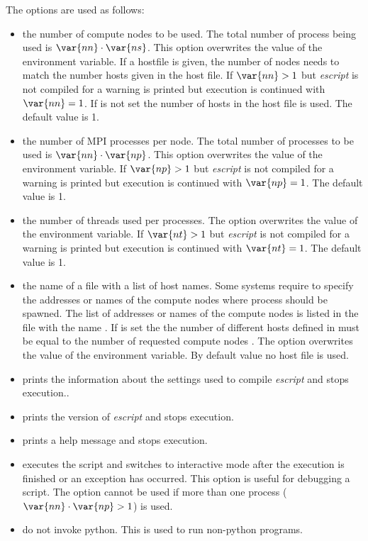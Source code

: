 The options are used as follows:
\begin{itemize}

 \item[\programopt{-n} \var{nn}] the number of compute nodes  to be used. The total number of process being used is 
$\var{nn} \cdot \var{ns}$. This option overwrites the value of the  environment variable. 
If a hostfile is given, the number of nodes needs to match the number hosts given in the host file.
If $\var{nn}>1$ but {\it escript}  is not compiled for \MPI a warning is printed but execution is continued with $\var{nn}=1$. If  is not set the
number of hosts in the host file is used. The default value is 1.
 
\item[\programopt{-p} \var{np}] the number of MPI processes per node.  The total number of processes to be used is 
$\var{nn} \cdot \var{np}$. This option overwrites the value of the  environment variable. If $\var{np}>1$ but {\it escript}  is not compiled for \MPI a warning is printed but execution is continued with $\var{np}=1$. The default value is 1.

 \item[\programopt{-t} \var{nt}] the number of threads used per processes.
The option overwrites the value of the  environment variable.
If $\var{nt}>1$ but {\it escript} is not compiled for \OPENMP a warning is printed but execution is continued with $\var{nt}=1$. The default value is 1.

 \item[\programopt{-f} \var{hostfile}] the name of a file with a list of host names. Some systems require to specify the addresses or names of the compute nodes where \MPI process should be spawned. The list of addresses or names of the compute nodes is listed in the file with the name . If  is set the 
the number of different
hosts defined in  must be equal to the number of requested compute nodes . The option overwrites the value of the  environment variable. By default value no host file is used.
 \item[\programopt{-c}] prints the information about the settings used to compile {\it escript} and stops execution..
 \item[\programopt{-V}] prints the version of {\it escript} and stops execution.
 \item[\programopt{-h}] prints a help message and stops execution.
 \item[\programopt{-i}] executes the script  and switches to interactive mode after the execution is finished or an exception has occurred. This option is useful for debugging a script. The option cannot be used if more than one process ($\var{nn} \cdot \var{np}>1$) is used.
\item[\programopt{-b}] do not invoke python. This is used to run non-python programs.


\end{itemize}
